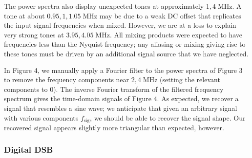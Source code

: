 \documentclass[11pt]{article}
\newcommand {\mt}{\mathrm}
\newcommand {\unit}[1]{\; \mt{#1}}
\begin{document}
The power spectra also display unexpected tones at approximately $1,4
\unit{MHz}$.  A tone at about $0.95, 1, 1.05 \unit{MHz}$ may be due to a
weak DC offset that replicates the input signal frequencies when mixed.
However, we are at a loss to explain very strong tones at $3.95, 4.05
\unit{MHz}$.  All mixing products were expected to have frequencies less than
the Nyquist frequency; any aliasing or mixing giving rise to these tones must
be driven by an additional signal source that we have neglected.

In Figure 4, we manually apply a Fourier filter to the power spectra of Figure
3 to remove the frequency components near $2, 4 \unit{MHz}$ (setting the
relevant components to 0).  The inverse Fourier transform of the filtered
frequency spectrum gives the time-domain signals of Figure 4.  As expected, we
recover a signal that resembles a sine wave; we anticipate that given an
arbitrary signal with various components $f_{\mt{sig}}$, we should be able to
recover the signal shape.  Our recovered signal appears slightly more
triangular than expected, however.

\subsubsection{Digital DSB}
\end{document}

